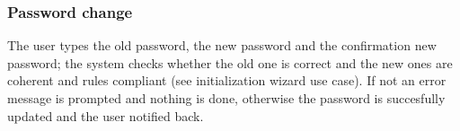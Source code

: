 \subsubsection{Password change}
\small{The user types the old password, the new password and the confirmation new password; the system checks whether the old one is correct and the new ones are coherent and rules compliant (see initialization wizard use case). If not an error message is prompted and nothing is done, otherwise the password is succesfully updated and the user notified back.}